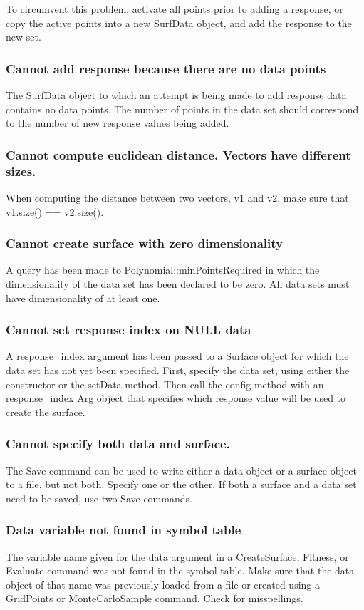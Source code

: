 \documentclass{article}
\begin{document}
To circumvent this problem, activate all points prior to adding a response, or
copy the active points into a new SurfData object, and add the response to the
new set.


\subsubsection{Cannot add response because there are no data points}
The SurfData object to which an attempt is being made to add response data
contains no data points.  The number of points in the data set should correspond
to the number of new response values being added.

\subsubsection{Cannot compute euclidean distance. Vectors have different sizes.}
When computing the distance between two vectors, v1 and v2, make sure that
v1.size() == v2.size().

\subsubsection{Cannot create surface with zero dimensionality}
A query has been made to Polynomial::minPointsRequired in which the
dimensionality of the data set has been declared to be zero.  All data sets must
have dimensionality of at least one.

\subsubsection{Cannot set response index on NULL data }
A response\_index argument has been passed to a Surface object for which the
data set has not yet been specified.  First, specify the data set, using either
the constructor or the setData method.  Then call the config method with an
response\_index Arg object that specifies which response value will be used to
create the surface.

\subsubsection{Cannot specify both data and surface.}
The Save command can be used to write either a data object or a surface object
to a file, but not both.  Specify one or the other.  If both a surface and a
data set need to be saved, use two Save commands.

\subsubsection{Data variable not found in symbol table}
The variable name given for the data argument in a CreateSurface, Fitness, or
Evaluate command was not found in the symbol table.  Make sure that the data
object of that name was previously loaded from a file or created using a
GridPoints or MonteCarloSample command.  Check for misspellings.
\end{document}
